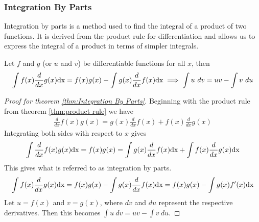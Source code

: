 \subsubsection{Integration By Parts}

Integration by parts is a method used to find the integral of a product of two functions. It is derived from the product rule for differentiation and allows us to express the integral of a product in terms of simpler integrals.

\begin{theo}{1}
	Let $f$ and $g$ (or $u$ and $v$) be differentiable functions for all $x$, then
	\begin{align}
		\int f(x)\frac{d}{dx}g(x)\textnormal{dx} = f(x)g(x) - \int g(x)\frac{d}{dx}f(x)\textnormal{dx} \implies \int u\ dv = uv - \int v\ du
	\end{align}
\end{theo}

\begin{proof}[Proof for theorem \ref{thm:Integration By Parts}]
	Beginning with the product rule from theorem \ref{thm:product rule} we have
	\begin{align}
		\frac{d}{dx}f(x)g(x)=g(x)\frac{d}{dx}f(x)+f(x)\frac{d}{dx}g(x)
	\end{align}
	Integrating both sides with respect to $x$ gives
	\begin{align}
		\int\frac{d}{dx}f(x)g(x) \textnormal{dx}=f(x)g(x)=\int g(x)\frac{d}{dx}f(x)\textnormal{dx}+\int f(x)\frac{d}{dx}g(x)\textnormal{dx}
	\end{align}
	This gives what is referred to as integration by parts.
	\begin{align}
		\int f(x)\frac{d}{dx}g(x)\textnormal{dx} = f(x)g(x) - \int g(x)\frac{d}{dx}f(x)\textnormal{dx} = f(x)g(x) - \int g(x)f'(x)\textnormal{dx}
	\end{align}
	Let $u=f(x)$ and $v=g(x)$, where $dv$ and $du$ represent the respective derivatives. Then this becomes $\int u\ dv = uv - \int v\ du$.
\end{proof}
